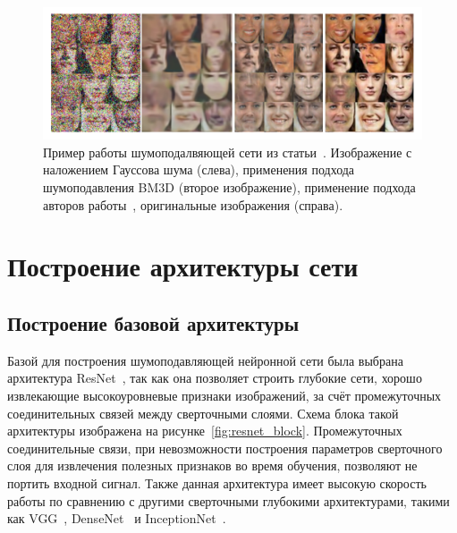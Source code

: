 \documentclass[14pt]{mmcs_article}
\begin{document}
\begin{figure}[H]
	\centering
	\includegraphics[width=\textwidth]{img/example_from_denoising_gan_paper}
	\caption{Пример работы шумоподалвяющей сети из статьи~\autocite{DenoisingGANPaper}. Изображение с наложением Гауссова шума (слева), применения подхода шумоподавления BM3D (второе изображение), применение подхода авторов работы~\autocite{DenoisingGANPaper}, оригинальные изображения (справа).}
	\label{fig:example_from_denoising_gan_paper}
\end{figure}



\section{Построение архитектуры сети}

\subsection{Построение базовой архитектуры}
\label{sec:resnet_block}


Базой для построения шумоподавляющей нейронной сети была выбрана архитектура ResNet~\autocite{ResNetPaper}, так как она позволяет строить глубокие сети, хорошо извлекающие высокоуровневые признаки изображений, за счёт промежуточных соединительных связей между сверточными слоями. Схема блока такой архитектуры изображена на рисунке~\ref{fig:resnet_block}. Промежуточных соединительные связи, при невозможности построения параметров сверточного слоя для извлечения полезных признаков во время обучения, позволяют не портить входной сигнал. Также данная архитектура имеет высокую скорость работы по сравнению с другими сверточными глубокими архитектурами, такими как VGG~\autocite{VGGPaper}, DenseNet~\autocite{DenseNetPaper} и InceptionNet~\autocite{InceptionPaper}.
\end{document}
